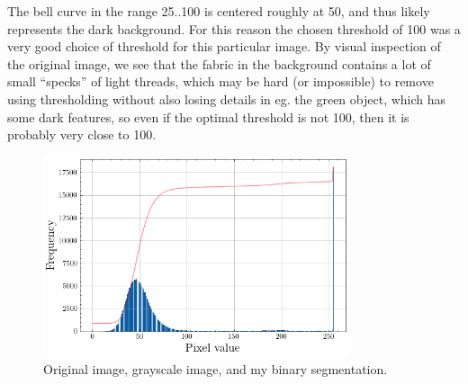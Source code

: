 The bell curve in the range 25..100 is centered roughly at 50, and thus likely
represents the dark background. For this reason the chosen threshold of 100 was
a very good choice of threshold for this particular image. By visual inspection
of the original image, we see that the fabric in the background contains a lot
of small ``specks'' of light threads, which may be hard (or impossible) to
remove using thresholding without also losing details in eg. the green object,
which has some dark features, so even if the optimal threshold is not 100, then
it is probably very close to 100.

\begin{figure}[H]
    \centering
    \includegraphics[width=0.8\textwidth]{figures/task_4_2.png}
    \caption{Original image, grayscale image, and my binary segmentation.}
    \label{fig:4.2}
\end{figure}

